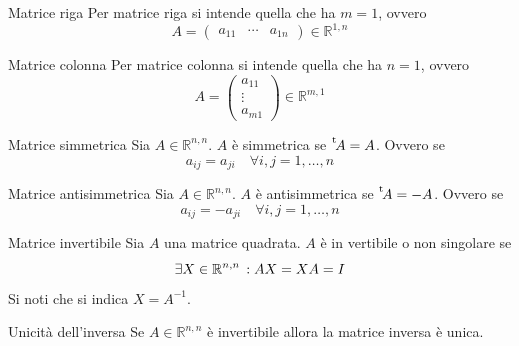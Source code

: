 \begin{Def}{Matrice riga}
  Per matrice riga si intende quella che ha $m=1$, ovvero
  \begin{equation*}
    A =
    \begin{pmatrix}
      a_{11} & \cdots & a_{1n}
    \end{pmatrix}
    \in\mathbb{R}^{1,n}
  \end{equation*}
\end{Def}

\begin{Def}{Matrice colonna}
  Per matrice colonna si intende quella che ha $n=1$, ovvero
  \begin{equation*}
    A =
    \begin{pmatrix}
      a_{11}\\
      \vdots\\
      a_{m1}
    \end{pmatrix}
    \in\mathbb{R}^{m,1}
  \end{equation*}
\end{Def}

\begin{Def}{Matrice simmetrica}
  Sia $A\in\mathbb{R}^{n,n}$. $A$ è simmetrica se $\mskip1mu\prescript{\smash{\mathrm t\mkern-3mu} }{}{\mathstrut A} = A$. Ovvero se
  \begin{equation*}
    a_{ij} = a_{ji}\quad\forall i,j=1,\ldots,n
  \end{equation*}
\end{Def}

\begin{Def}{Matrice antisimmetrica}
  Sia $A\in\mathbb{R}^{n,n}$. $A$ è antisimmetrica se $\mskip1mu\prescript{\smash{\mathrm t\mkern-3mu} }{}{\mathstrut A} = -A$. Ovvero se
  \begin{equation*}
    a_{ij} = -a_{ji}\quad \forall i,j=1,\ldots,n
  \end{equation*}
\end{Def}

\begin{Def}{Matrice invertibile}\label{def:matrice_inversa}
  Sia $A$ una matrice quadrata. $A$ è in vertibile o non singolare se
  \begin{equation*}
    \exists X\in\mathbb{R}^{n,n}\,: AX = XA = I
  \end{equation*}
  Si noti che si indica $X = A^{-1}$.
\end{Def}

\begin{Thm}{Unicità dell'inversa}
  Se $A\in\mathbb{R}^{n,n}$ è invertibile allora la matrice inversa è unica.
\end{Thm}

